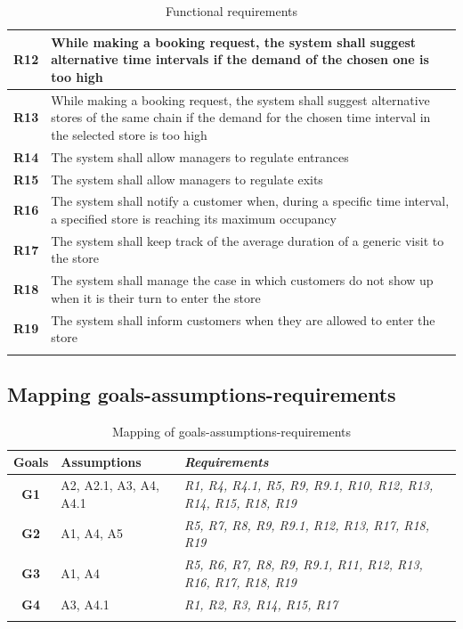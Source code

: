 \documentclass[a4paper,oneside,11pt]{book}   %
\begin{document}
\begin{longtable}[c]{|>{\bfseries{}}c|H{.65\textwidth}|}
        R12  & While making a booking request, the system shall suggest alternative time intervals if the demand of the chosen one is too high \\ \hline
        R13  & While making a booking request, the system shall suggest alternative stores of the same chain if the demand for the chosen time interval in the selected store is too high \\ \hline
        R14  & The system shall allow managers to regulate entrances  \\ \hline
        R15  & The system shall allow managers to regulate exits \\ \hline
        R16  & The system shall notify a customer when, during a specific time interval, a specified store is reaching its maximum occupancy \\ \hline
        R17  & The system shall keep track of the average duration of a generic visit to the store \\ \hline
        R18  & The system shall manage the case in which customers do not show up when it is their turn to enter the store \\ \hline
        R19  & The system shall inform customers when they are allowed to enter the store \\ \hline
        \caption{Functional requirements}
        \label{table:functional_requirements}
    \end{longtable}
    
    \subsection{Mapping goals-assumptions-requirements}
    \begin{longtable}[c] { |>{\bfseries{}}c|P{0.22\textwidth}|>{\em}H{0.40\textwidth}| }
        \hline
        \textbf{Goals} & \textbf{Assumptions} & \emph{\textbf{Requirements}} \\
        \hline
        G1 & A2, A2.1, A3, A4, A4.1 & R1, R4, R4.1, R5, R9, R9.1, R10, R12, R13, R14, R15, R18, R19 \\ \hline
        G2 & A1, A4, A5       & R5, R7, R8, R9, R9.1, R12, R13, R17, R18, R19 \\ \hline
        G3 & A1, A4           & R5, R6, R7, R8, R9, R9.1, R11, R12, R13, R16, R17, R18, R19 \\ \hline
        G4 & A3, A4.1         & R1, R2, R3, R14, R15, R17 \\
        \hline
        \caption{Mapping of goals-assumptions-requirements}
        \label{table:map_goals_assumptions_requirements}
    \end{longtable}
    \newpage
\end{document}
